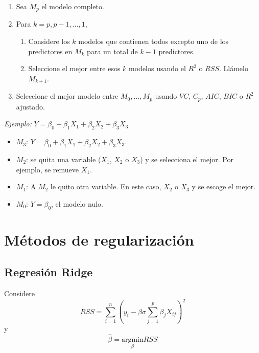 \documentclass[
  12pt,
]{book}
\providecommand{\tightlist}{%
  \setlength{\itemsep}{0pt}\setlength{\parskip}{0pt}}
\theoremstyle{definition}
\theoremstyle{definition}
\theoremstyle{definition}
\theoremstyle{remark}
\begin{document}
\begin{enumerate}
\def\labelenumi{\arabic{enumi}.}
\tightlist
\item
  Sea \(M_p\) el modelo completo.
\item
  Para \(k=p,p-1,\dots,1\),

  \begin{enumerate}
  \def\labelenumii{\alph{enumii}.}
  \tightlist
  \item
    Considere los \(k\) modelos que contienen todos excepto uno de los predictores en \(M_k\) para un total de \(k-1\) predictores.
  \item
    Seleccione el mejor entre esos \(k\) modelos usando el \(R^2\) o \(RSS\). Llámelo \(M_{k+1}\).
  \end{enumerate}
\item
  Seleccione el mejor modelo entre \(M_0,\dots,M_p\) usando \(VC\), \(C_p\), \(AIC\), \(BIC\) o \(R^2\) ajustado.
\end{enumerate}

\emph{Ejemplo:} \(Y=\beta_0+\beta_1X_1+\beta_2X_2+\beta_3X_3\)

\begin{itemize}
\item
  \(M_3\): \(Y = \beta_0 +\beta_1X_1+\beta_2X_2+\beta_3X_3\).
\item
  \(M_2\): se quita una variable (\(X_1\), \(X_2\) o \(X_3\)) y se selecciona el mejor. Por ejemplo, se remueve \(X_1\).
\item
  \(M_1\): A \(M_{2}\) le quito otra variable. En este caso, \(X_2\) o \(X_3\) y se escoge el mejor.
\item
  \(M_0\): \(Y=\beta_0\), el modelo nulo.
\end{itemize}

\hypertarget{muxe9todos-de-regularizaciuxf3n}{%
\section{Métodos de regularización}\label{muxe9todos-de-regularizaciuxf3n}}

\hypertarget{regresiuxf3n-ridge}{%
\subsection{Regresión Ridge}\label{regresiuxf3n-ridge}}

Considere
\[ RSS = \sum_{i=1}^{n}\left(y_i-\beta\sigma\sum_{j=1}^{p}\beta_jX_{ij}\right)^2 \]
y
\[
\hat\beta = \underset{\beta}{\mathrm{argmin}} RSS
\]
\end{document}
